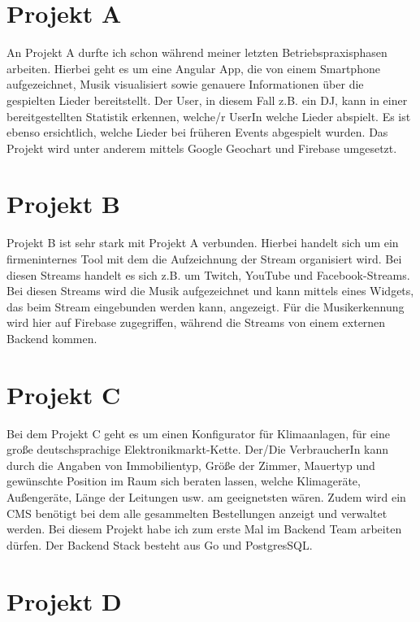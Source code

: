\section{Projekt A}

An Projekt A durfte ich schon während meiner letzten Betriebspraxisphasen arbeiten. Hierbei geht es um eine Angular\cite{angular} App, die von einem Smartphone aufgezeichnet, Musik visualisiert sowie genauere Informationen über die gespielten Lieder bereitstellt. Der User, in diesem Fall z.B. ein DJ, kann in einer bereitgestellten Statistik erkennen, welche/r UserIn welche Lieder abspielt. Es ist ebenso ersichtlich, welche Lieder bei früheren Events abgespielt wurden. Das Projekt wird unter anderem mittels Google Geochart und Firebase\cite{firebase} umgesetzt.

\section{Projekt B}

Projekt B ist sehr stark mit Projekt A verbunden. Hierbei handelt sich um ein firmeninternes Tool mit dem die Aufzeichnung der Stream organisiert wird. Bei diesen Streams handelt es sich z.B. um Twitch, YouTube und Facebook-Streams. Bei diesen Streams wird die Musik aufgezeichnet und kann mittels eines Widgets, das beim Stream eingebunden werden kann, angezeigt. Für die Musikerkennung wird hier auf Firebase\cite{firebase} zugegriffen, während die Streams von einem externen Backend kommen.

\section{Projekt C}

Bei dem Projekt C geht es um einen Konfigurator für Klimaanlagen, für eine große deutschsprachige Elektronikmarkt-Kette. Der/Die VerbraucherIn kann durch die Angaben von Immobilientyp, Größe der Zimmer, Mauertyp und gewünschte Position im Raum sich beraten lassen, welche Klimageräte, Außengeräte, Länge der Leitungen usw. am geeignetsten wären. Zudem wird ein CMS benötigt bei dem alle gesammelten Bestellungen anzeigt und verwaltet werden. Bei diesem Projekt habe ich zum erste Mal im Backend Team arbeiten dürfen. Der Backend Stack besteht aus Go\cite{gostarter}\cite{go} und PostgresSQL\cite{psql}.

\section{Projekt D}

